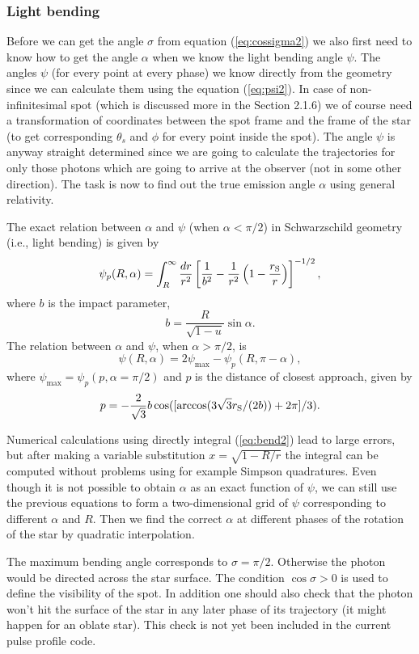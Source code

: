 \documentclass{wihuri}
\def\rg{r_{\rm S}} %
\def\be{\begin{equation}}
\def\ee{\end{equation}}
\def\rg{r_{\rm S}} %
\def\thetas{\theta_{s}}
\begin{document}
\subsubsection{Light bending}

Before we can get the angle $\sigma$ from equation (\ref{eq:cossigma2}) we also first need to know how to get the angle $\alpha$ when we know the light bending angle $\psi$. The angles $\psi$ (for every point at every phase) we know directly from the geometry since we can calculate them using the equation (\ref{eq:psi2}). In case of non-infinitesimal spot (which is discussed more in the Section 2.1.6) we of course need a  transformation of coordinates between the spot frame and the frame of the star (to get corresponding $\thetas$ and $\phi$ for every point inside the spot). The angle $\psi$ is anyway straight determined since we are going to calculate the trajectories for only those photons which are going to arrive at the observer (not in some other direction). The task is now to find out the true emission angle $\alpha$ using general relativity. 

The exact relation between $\alpha$ and $\psi$ (when $\alpha < \pi/2$) in Schwarzschild geometry (i.e., light bending) is given by \cite{mtw}%
\be \label{eq:bend2}
  \psi_{p}(R,\alpha)=\int_R^{\infty} \frac{dr}{r^2} \left[ \frac{1}{b^2} -
       \frac{1}{r^2}\left( 1- \frac{\rg}{r}\right)\right]^{-1/2} ,
\ee
where $b$ is the impact parameter,
\be \label{eq:impact2}
  b=\frac{R}{\sqrt{1-u}} \sin\alpha .
\ee
The relation between  $\alpha$ and $\psi$, when $\alpha > \pi/2$, is 
\be 
\psi(R,\alpha)=2\psi_{\max}-\psi_{p}(R,\pi-\alpha),
\ee 
where $\psi_{\max} = \psi_{p}(p,\alpha=\pi/2)$ and $p$ is the distance of closest approach, given by
\be
p = -\frac{2}{\sqrt{3}}b\cos([\arccos(3\sqrt{3}\rg/(2b))+2\pi]/3).
\ee


Numerical calculations using directly integral (\ref{eq:bend2}) lead to large errors, but after making a variable substitution $x = \sqrt{1-R/r}$ the integral can be computed without problems using for example Simpson quadratures. Even though it is not possible to obtain $\alpha$ as an exact function of $\psi$, we can still use the previous equations to form a two-dimensional grid of $\psi$ corresponding to different $\alpha$ and $R$. Then we find the correct $\alpha$ at different phases of the rotation of the star by quadratic interpolation. 



The maximum bending angle corresponds to $\sigma=\pi/2$. Otherwise the photon would be directed across the star surface. 
The condition $\cos \sigma>0$ is used to define the visibility of the spot. In addition one should also check that the photon won't hit the surface of the star in any later phase of its trajectory (it might happen for an oblate star). This check is not yet been included in the current pulse profile code.
\end{document}
